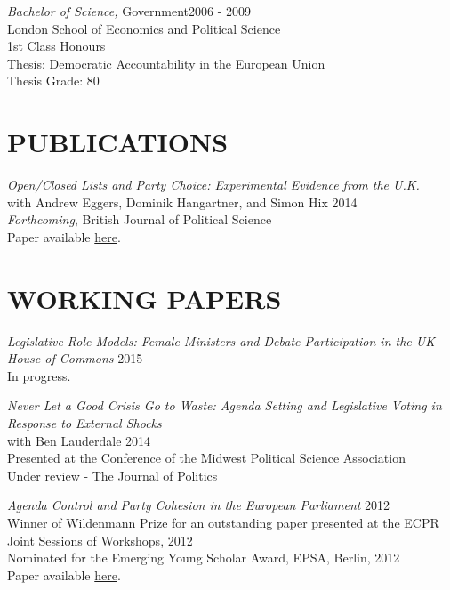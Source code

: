 \documentclass[line,margin]{res}
\begin{document}
\begin{resume}
					{\sl Bachelor of Science,} Government\hfill 2006 - 2009 \\
                London School of Economics and Political Science\\
                1st Class Honours \\
                Thesis: Democratic Accountability in the European Union\\%
				Thesis Grade: 80

\section{PUBLICATIONS} 

{\sl Open/Closed Lists and Party Choice: Experimental Evidence from the U.K.}\\with Andrew Eggers, Dominik Hangartner, and Simon Hix \hfill 2014\\
\emph{Forthcoming}, British Journal of Political Science\\
Paper available \href{https://www.academia.edu/7934679/Open_Closed_List_and_Party_Choice_Experimental_Evidence_from_the_U.K} {here}.

\section{WORKING PAPERS} 
{\sl Legislative Role Models: Female Ministers and Debate Participation in the UK House of Commons} \hfill 2015\\
In progress.

{\sl Never Let a Good Crisis Go to Waste: Agenda Setting and Legislative Voting in Response to External Shocks} \\with Ben Lauderdale \hfill 2014\\
Presented at the Conference of the Midwest Political Science Association\\
Under review - The Journal of Politics

{\sl Agenda Control and Party Cohesion in the European Parliament}  \hfill 2012\\
Winner of Wildenmann Prize for an outstanding paper presented at the ECPR Joint Sessions of Workshops, 2012\\
Nominated for the Emerging Young Scholar Award, EPSA, Berlin, 2012\\
Paper available \href{http://www.academia.edu/2151951/Agenda_Control_and_Party_Cohesion_in_the_European_Parliament} {here}.


\end{resume}
\end{document}
